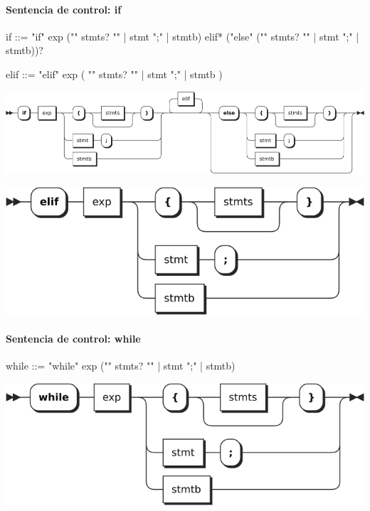 \paragraph{Sentencia de control: if}
\begin{myverbatim}[style=nonumbers,
    basicstyle=\tiny, %
]
if ::= "if" exp ("{" stmts? "}" | stmt ";" | stmtb) elif* ("else" ("{" stmts? "}" | stmt ";" | stmtb))?

elif ::=  "elif" exp ( "{" stmts? "}" | stmt ";" | stmtb ) 
\end{myverbatim}  	
\begin{center}
\includegraphics[scale=0.5]{diagram/if.png} \\
\end{center}
\begin{center}
\includegraphics[scale=0.5]{diagram/elif.png} \\
\end{center}

\paragraph{Sentencia de control: while}
\begin{multicols}{2}
\begin{myverbatim}[style=nonumbers,
    basicstyle=\tiny]
while ::= 
   "while" exp ("{" stmts? "}" | stmt ";" | stmtb)
\end{myverbatim}  	
\columnbreak
\begin{center}
\includegraphics[scale=0.5]{diagram/while.png} \\
\end{center}
\end{multicols}

